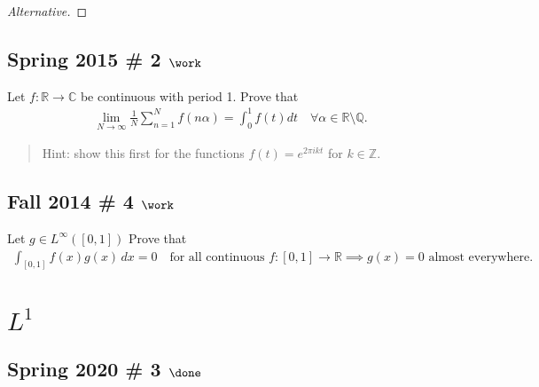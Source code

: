 \begin{solution}
\begin{proof}[Alternative]
\end{proof}

\end{solution}

\hypertarget{spring-2015-2-work}{%
\subsection{\texorpdfstring{Spring 2015 \# 2
\(\work\)}{Spring 2015 \# 2 \textbackslash work}}\label{spring-2015-2-work}}

Let \(f: {\mathbb{R}}\to {\mathbb{C}}\) be continuous with period 1.
Prove that
\begin{align*}
\lim _{N \rightarrow \infty} \frac{1}{N} \sum_{n=1}^{N} f(n \alpha)=\int_{0}^{1} f(t) d t \quad \forall \alpha \in {\mathbb{R}}\setminus{\mathbb{Q}}.
\end{align*}

\begin{quote}
Hint: show this first for the functions \(f(t) = e^{2\pi i k t}\) for
\(k\in {\mathbb{Z}}\).
\end{quote}

\hypertarget{fall-2014-4-work}{%
\subsection{\texorpdfstring{Fall 2014 \# 4
\(\work\)}{Fall 2014 \# 4 \textbackslash work}}\label{fall-2014-4-work}}

Let \(g\in L^\infty([0, 1])\) Prove that
\begin{align*}
\int _{[0,1]} f(x) g(x)\, dx = 0 
\quad\text{for all continuous } f:[0, 1] \to {\mathbb{R}}
\implies g(x) = 0 \text{ almost everywhere. }
\end{align*}

\hypertarget{l1}{%
\section{\texorpdfstring{\(L^1\)}{L\^{}1}}\label{l1}}

\hypertarget{spring-2020-3-done}{%
\subsection{\texorpdfstring{Spring 2020 \# 3
\(\done\)}{Spring 2020 \# 3 \textbackslash done}}\label{spring-2020-3-done}}

